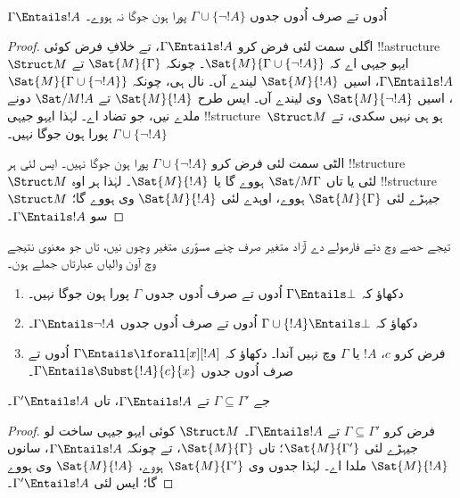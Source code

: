 \documentclass[../../../include/open-logic-section]{subfiles}
\begin{document}
\begin{prop}
$\Gamma \Entails !A$ اُدوں تے صرف اُدوں جدوں $\Gamma \cup \{\lnot !A\}$
پورا ہون جوگا نہ ہووے۔
\end{prop}

\begin{proof}
اگلی سمت لئی فرض کرو $\Gamma \Entails !A$، تے خلافِ فرض کوئی
!!a{structure}~$\Struct M$ ایہو جیہی اے کہ $\Sat{M}{\Gamma
  \cup \{ \lnot !A \}}$۔ چونکہ $\Sat{M}{\Gamma}$ تے $\Gamma \Entails
!A$، اسیں $\Sat{M}{!A}$ لیندے آں۔ نال ہی، چونکہ
$\Sat{M}{\Gamma\cup \{ \lnot !A \}}$، اسیں $\Sat{M}{\lnot !A}$
وی لیندے آں۔ ایس طرح $\Sat{M}{!A}$ تے $\Sat/{M}{!A}$ دونے
ملدے نیں، جو تضاد اے۔ لہٰذا ایہو جیہی !!{structure}~$\Struct M$
ہو ہی نہیں سکدی، تے $\Gamma \cup \{ \lnot !A \}$ پورا ہون جوگا نہیں۔

الٹی سمت لئی فرض کرو $\Gamma \cup \{ \lnot !A \}$ پورا ہون جوگا نہیں۔
ایس لئی ہر !!{structure}~$\Struct M$ لئی یا تاں
$\Sat/{M}{\Gamma}$ ہووے گا یا $\Sat{M}{!A}$۔ لہٰذا ہر اوہ
!!{structure}~$\Struct M$ جیہڑے لئی $\Sat{M}{\Gamma}$ ہووے،
اوہدے لئی $\Sat{M}{!A}$ وی ہووے گا؛ سو $\Gamma \Entails !A$۔
\end{proof}

\begin{prob}
تیجے حصے وچ دتے فارمولے دے آزاد متغیر صرف چنے مسوّری متغیر
وچوں نیں، تاں جو معنوی نتیجے وچ آون والیاں عبارتاں جملے ہون۔
\begin{enumerate}
\item دکھاؤ کہ $\Gamma \Entails \bot$ اُدوں تے صرف اُدوں جدوں $\Gamma$ پورا ہون جوگا نہیں۔
\item دکھاؤ کہ $\Gamma \cup \{!A\} \Entails \bot$ اُدوں تے صرف اُدوں جدوں $\Gamma \Entails \lnot !A$۔
\item فرض کرو $c$، $!A$ یا $\Gamma$ وچ نہیں آندا۔ دکھاؤ کہ
  $\Gamma \Entails \lforall[x][!A]$ اُدوں تے صرف اُدوں جدوں $\Gamma \Entails
  \Subst{!A}{c}{x}$۔
\end{enumerate}
\end{prob}

\begin{prop}
جے $\Gamma \subseteq \Gamma'$ تے $\Gamma \Entails !A$، تاں $\Gamma'
\Entails !A$۔
\end{prop}

\begin{proof}
فرض کرو $\Gamma \subseteq \Gamma'$ تے $\Gamma \Entails !A$۔
$\Struct M$ کوئی ایہو جیہی ساخت لو جیہڑے لئی $\Sat{M}{\Gamma'}$؛
تاں $\Sat{M}{\Gamma}$، تے چونکہ $\Gamma \Entails !A$،
سانوں $\Sat{M}{!A}$ ملدا اے۔ لہٰذا جدوں وی $\Sat{M}{\Gamma'}$
ہووے، $\Sat{M}{!A}$ وی ہووے گا؛ ایس لئی $\Gamma' \Entails !A$۔
\end{proof}
\end{document}
